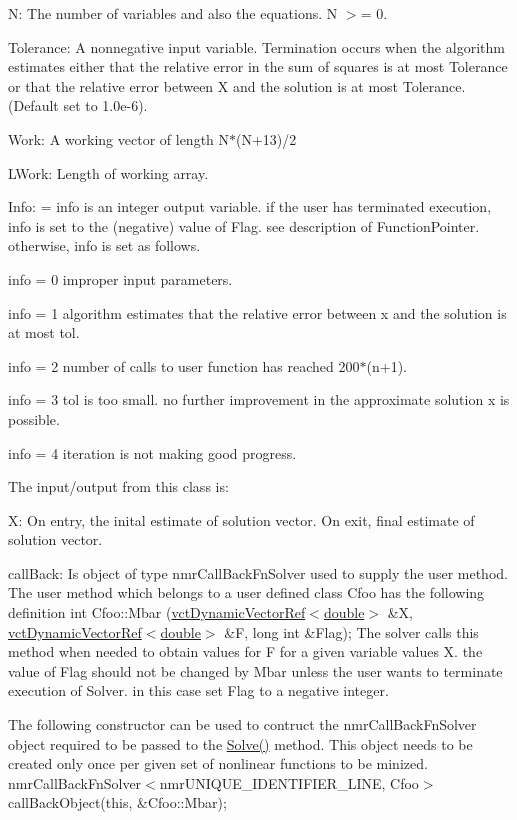 \begin{DoxyItemize}
\item N\+: The number of variables and also the equations. N $>$= 0.
\item Tolerance\+: A nonnegative input variable. Termination occurs when the algorithm estimates either that the relative error in the sum of squares is at most Tolerance or that the relative error between X and the solution is at most Tolerance. (Default set to 1.\+0e-\/6).
\item Work\+: A working vector of length N$\ast$(N+13)/2
\item L\+Work\+: Length of working array.
\item Info\+: = info is an integer output variable. if the user has terminated execution, info is set to the (negative) value of Flag. see description of Function\+Pointer. otherwise, info is set as follows.

info = 0 improper input parameters.

info = 1 algorithm estimates that the relative error between x and the solution is at most tol.

info = 2 number of calls to user function has reached 200$\ast$(n+1).

info = 3 tol is too small. no further improvement in the approximate solution x is possible.

info = 4 iteration is not making good progress.
\end{DoxyItemize}

The input/output from this class is\+:
\begin{DoxyItemize}
\item X\+: On entry, the inital estimate of solution vector. On exit, final estimate of solution vector.
\item call\+Back\+: Is object of type nmr\+Call\+Back\+Fn\+Solver used to supply the user method. The user method which belongs to a user defined class \textquotesingle{}Cfoo\textquotesingle{} has the following definition int Cfoo\+::\+Mbar (\hyperlink{classvct_dynamic_vector_ref}{vct\+Dynamic\+Vector\+Ref$<$double$>$} \&X, \hyperlink{classvct_dynamic_vector_ref}{vct\+Dynamic\+Vector\+Ref$<$double$>$} \&F, long int \&Flag); The solver calls this method when needed to obtain values for F for a given variable values X. the value of Flag should not be changed by Mbar unless the user wants to terminate execution of Solver. in this case set Flag to a negative integer.

The following constructor can be used to contruct the nmr\+Call\+Back\+Fn\+Solver object required to be passed to the \hyperlink{classnmr_fn_solver_aa11bd4b3ac560b2be8fa8c6ec1fd1f99}{Solve()} method. This object needs to be created only once per given set of nonlinear functions to be minized. nmr\+Call\+Back\+Fn\+Solver$<$nmr\+U\+N\+I\+Q\+U\+E\+\_\+\+I\+D\+E\+N\+T\+I\+F\+I\+E\+R\+\_\+\+L\+I\+N\+E, Cfoo$>$ call\+Back\+Object(this, \&\+Cfoo\+::\+Mbar);
\end{DoxyItemize}

